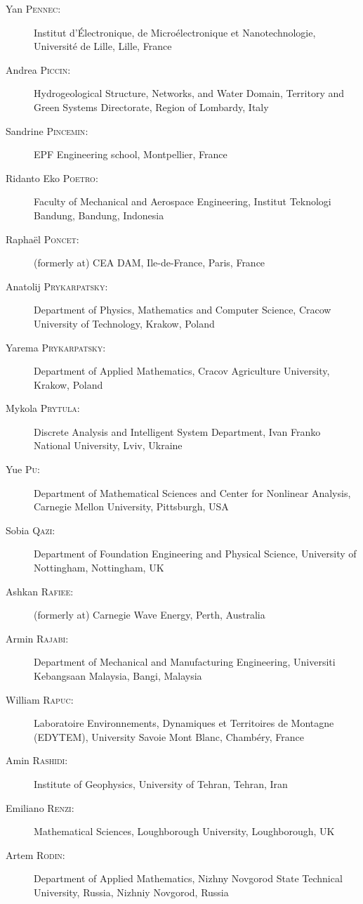 \documentclass[final, a4paper, oneside, 12pt]{article}
\numberwithin{equation}{section}
\begin{document}
\begin{description}
  \item[Yan \textsc{Pennec}:] Institut d'\'Electronique, de Micro\'electronique et Nanotechnologie, Universit\'e de Lille, Lille, France
  \item[Andrea \textsc{Piccin}:] Hydrogeological Structure, Networks, and Water Domain, Territory and Green Systems Directorate, Region of Lombardy, Italy
  \item[Sandrine \textsc{Pincemin}:] EPF Engineering school, Montpellier, France
  \item[Ridanto Eko \textsc{Poetro}:] Faculty of Mechanical and Aerospace Engineering, Institut Teknologi Bandung, Bandung, Indonesia
  \item[Rapha\"el \textsc{Poncet}:] (formerly at) CEA DAM, Ile-de-France, Paris, France
  \item[Anatolij \textsc{Prykarpatsky}:] Department of Physics, Mathematics and Computer Science, Cracow University of Technology, Krakow, Poland
  \item[Yarema \textsc{Prykarpatsky}:] Department of Applied Mathematics, Cracov Agriculture University, Krakow, Poland
  \item[Mykola \textsc{Prytula}:] Discrete Analysis and Intelligent System Department, Ivan Franko National University, Lviv, Ukraine
  \item[Yue \textsc{Pu}:] Department of Mathematical Sciences and Center for Nonlinear Analysis, Carnegie Mellon University, Pittsburgh, USA
  \item[Sobia \textsc{Qazi}:] Department of Foundation Engineering and Physical Science, University of Nottingham, Nottingham, UK
  \item[Ashkan \textsc{Rafiee}:] (formerly at) Carnegie Wave Energy, Perth, Australia
  \item[Armin \textsc{Rajabi}:] Department of Mechanical and Manufacturing Engineering, Universiti Kebangsaan Malaysia, Bangi, Malaysia
  \item[William \textsc{Rapuc}:] Laboratoire Environnements, Dynamiques et Territoires de Montagne (EDYTEM), University Savoie Mont Blanc, Chamb\'ery, France
  \item[Amin \textsc{Rashidi}:] Institute of Geophysics, University of Tehran, Tehran, Iran
  \item[Emiliano \textsc{Renzi}:] Mathematical Sciences, Loughborough University, Loughborough, UK
  \item[Artem \textsc{Rodin}:] Department of Applied Mathematics, Nizhny Novgorod State Technical University, Russia, Nizhniy Novgorod, Russia

\end{description}
\end{document}
